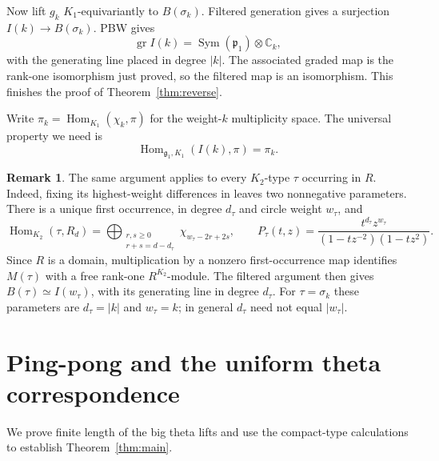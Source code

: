 \documentclass[11pt]{article}
\newcommand{\C}{\mathbb C}
\newcommand{\Sym}{\operatorname{Sym}}
\newcommand{\Hom}{\operatorname{Hom}}
\newcommand{\gr}{\operatorname{gr}}
\newcommand{\fg}{\mathfrak g}
\newcommand{\fp}{\mathfrak p}
\theoremstyle{definition}
\newtheorem{remark}[theorem]{Remark}
\numberwithin{equation}{section}
\begin{document}
Now lift $g_k$ $K_1$-equivariantly to $B(\sigma_k)$.
Filtered generation gives a surjection $I(k)\to B(\sigma_k)$.
PBW gives
\[
 \gr I(k)=\Sym(\fp_1)\otimes\C_k,
\]
with the generating line placed in degree $|k|$.
The associated graded map is the rank-one isomorphism just proved, so
the filtered map is an isomorphism. This finishes the proof of
Theorem~\ref{thm:reverse}.

Write $\pi_k=\Hom_{K_1}(\chi_k,\pi)$
for the weight-$k$ multiplicity space. The universal property we need is
\begin{equation}\label{eq:universalhom}
 \Hom_{\fg_1,K_1}(I(k),\pi)=\pi_k.
\end{equation}

\begin{remark}\label{rem:allreverse}
The same argument applies to every $K_2$-type $\tau$ occurring in $R$.
Indeed, fixing its highest-weight differences in
\cite[Proposition~5.1]{LS19} leaves two nonnegative parameters. There
is a unique first occurrence, in degree $d_\tau$ and circle weight
$w_\tau$, and
\[
 \Hom_{K_2}(\tau,R_d)
 =\bigoplus_{\substack{r,s\geq0\\r+s=d-d_\tau}}
       \chi_{w_\tau-2r+2s},\qquad
 P_\tau(t,z)=\frac{t^{d_\tau}z^{w_\tau}}
 {(1-tz^{-2})(1-tz^2)}.
\]
Since $R$ is a domain, multiplication by a nonzero first-occurrence
map identifies $M(\tau)$ with a free rank-one $R^{K_2}$-module.
The filtered argument then gives
$B(\tau)\simeq I(w_\tau)$, with its generating line in degree
$d_\tau$. For $\tau=\sigma_k$ these parameters are $d_\tau=|k|$
and $w_\tau=k$; in general $d_\tau$ need not equal $|w_\tau|$.
\end{remark}

\section{Ping-pong and the uniform theta correspondence}\label{sec:pingpong}
We prove finite length of the big theta lifts and use the compact-type
calculations to establish Theorem~\ref{thm:main}.
\end{document}
